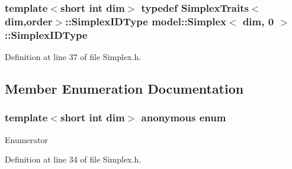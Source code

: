 \subsubsection[{Simplex\+I\+D\+Type}]{\setlength{\rightskip}{0pt plus 5cm}template$<$short int dim$>$ typedef {\bf Simplex\+Traits}$<${\bf dim},{\bf order}$>$\+::{\bf Simplex\+I\+D\+Type} {\bf model\+::\+Simplex}$<$ {\bf dim}, 0 $>$\+::{\bf Simplex\+I\+D\+Type}}\label{classmodel_1_1_simplex_3_01dim_00_010_01_4_a83643730c831942341d6e5117a9d59d7}


Definition at line 37 of file Simplex.\+h.



\subsection{Member Enumeration Documentation}
\hypertarget{classmodel_1_1_simplex_3_01dim_00_010_01_4_ab6d1cd72337e8ce0a64beaee913246be}{}\subsubsection[{anonymous enum}]{\setlength{\rightskip}{0pt plus 5cm}template$<$short int dim$>$ anonymous enum}\label{classmodel_1_1_simplex_3_01dim_00_010_01_4_ab6d1cd72337e8ce0a64beaee913246be}
\begin{Desc}
\item[Enumerator]\par
\begin{description}
\item[{\em 
\hypertarget{classmodel_1_1_simplex_3_01dim_00_010_01_4_ab6d1cd72337e8ce0a64beaee913246bea90c46bee7ed64bfbbf6278f8dea5b9d1}{}order\label{classmodel_1_1_simplex_3_01dim_00_010_01_4_ab6d1cd72337e8ce0a64beaee913246bea90c46bee7ed64bfbbf6278f8dea5b9d1}
}]\end{description}
\end{Desc}


Definition at line 34 of file Simplex.\+h.

